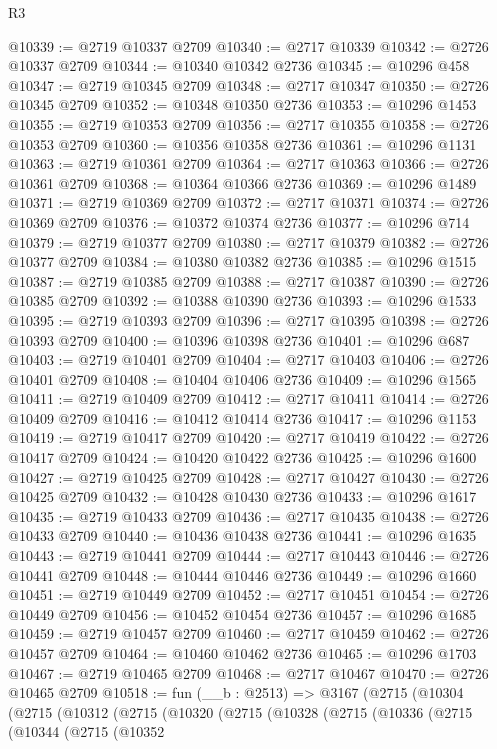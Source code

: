 \begin{lexlean}{R3}
\begin{coremodule}
@10339 := @2719 @10337 @2709
@10340 := @2717 @10339
@10342 := @2726 @10337 @2709
@10344 := @10340 @10342 @2736
@10345 := @10296 @458
@10347 := @2719 @10345 @2709
@10348 := @2717 @10347
@10350 := @2726 @10345 @2709
@10352 := @10348 @10350 @2736
@10353 := @10296 @1453
@10355 := @2719 @10353 @2709
@10356 := @2717 @10355
@10358 := @2726 @10353 @2709
@10360 := @10356 @10358 @2736
@10361 := @10296 @1131
@10363 := @2719 @10361 @2709
@10364 := @2717 @10363
@10366 := @2726 @10361 @2709
@10368 := @10364 @10366 @2736
@10369 := @10296 @1489
@10371 := @2719 @10369 @2709
@10372 := @2717 @10371
@10374 := @2726 @10369 @2709
@10376 := @10372 @10374 @2736
@10377 := @10296 @714
@10379 := @2719 @10377 @2709
@10380 := @2717 @10379
@10382 := @2726 @10377 @2709
@10384 := @10380 @10382 @2736
@10385 := @10296 @1515
@10387 := @2719 @10385 @2709
@10388 := @2717 @10387
@10390 := @2726 @10385 @2709
@10392 := @10388 @10390 @2736
@10393 := @10296 @1533
@10395 := @2719 @10393 @2709
@10396 := @2717 @10395
@10398 := @2726 @10393 @2709
@10400 := @10396 @10398 @2736
@10401 := @10296 @687
@10403 := @2719 @10401 @2709
@10404 := @2717 @10403
@10406 := @2726 @10401 @2709
@10408 := @10404 @10406 @2736
@10409 := @10296 @1565
@10411 := @2719 @10409 @2709
@10412 := @2717 @10411
@10414 := @2726 @10409 @2709
@10416 := @10412 @10414 @2736
@10417 := @10296 @1153
@10419 := @2719 @10417 @2709
@10420 := @2717 @10419
@10422 := @2726 @10417 @2709
@10424 := @10420 @10422 @2736
@10425 := @10296 @1600
@10427 := @2719 @10425 @2709
@10428 := @2717 @10427
@10430 := @2726 @10425 @2709
@10432 := @10428 @10430 @2736
@10433 := @10296 @1617
@10435 := @2719 @10433 @2709
@10436 := @2717 @10435
@10438 := @2726 @10433 @2709
@10440 := @10436 @10438 @2736
@10441 := @10296 @1635
@10443 := @2719 @10441 @2709
@10444 := @2717 @10443
@10446 := @2726 @10441 @2709
@10448 := @10444 @10446 @2736
@10449 := @10296 @1660
@10451 := @2719 @10449 @2709
@10452 := @2717 @10451
@10454 := @2726 @10449 @2709
@10456 := @10452 @10454 @2736
@10457 := @10296 @1685
@10459 := @2719 @10457 @2709
@10460 := @2717 @10459
@10462 := @2726 @10457 @2709
@10464 := @10460 @10462 @2736
@10465 := @10296 @1703
@10467 := @2719 @10465 @2709
@10468 := @2717 @10467
@10470 := @2726 @10465 @2709
@10518 := fun (__b : @2513) =>
  @3167
    (@2715
      (@10304
        (@2715
          (@10312
            (@2715
              (@10320
                (@2715
                  (@10328
                    (@2715
                      (@10336
                        (@2715
                          (@10344
                            (@2715
                              (@10352

\end{coremodule}
\end{lexlean}
